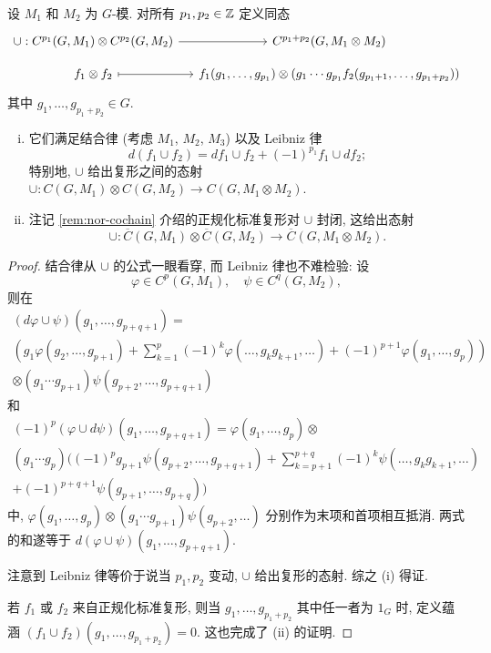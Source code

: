 \begin{definition-proposition}[标准复形上的杯积]\label{def:group-cup-3}
	设 $M_1$ 和 $M_2$ 为 $G$-模. 对所有 $p_1, p_2 \in \mathbb{Z}$ 定义同态
	\[\begin{tikzcd}[row sep=small, column sep=small]
		\cup: C^{p_1}(G, M_1) \otimes C^{p_2}(G, M_2) \arrow[r] & C^{p_1 + p_2}(G, M_1 \otimes M_2) \\
		f_1 \otimes f_2 \arrow[mapsto, r] & f_1(g_1, \ldots, g_{p_1}) \otimes (g_1 \cdots g_{p_1} f_2(g_{p_1 + 1}, \ldots, g_{p_1 + p_2}))
	\end{tikzcd}\]
	其中 $g_1, \ldots, g_{p_1 + p_2} \in G$.
	\begin{enumerate}[(i)]
		\item 它们满足结合律 (考虑 $M_1$, $M_2$, $M_3$) 以及 Leibniz 律
		\[ d(f_1 \cup f_2) = df_1 \cup f_2 + (-1)^{p_1} f_1 \cup d f_2; \]
		特别地, $\cup$ 给出复形之间的态射 $\cup: C(G, M_1) \otimes C(G, M_2) \to C(G, M_1 \otimes M_2)$.
		\item 注记 \ref{rem:nor-cochain} 介绍的正规化标准复形对 $\cup$ 封闭, 这给出态射
		\[ \cup: \overline{C}(G, M_1) \otimes \overline{C}(G, M_2) \to \overline{C}(G, M_1 \otimes M_2). \]
	\end{enumerate}
\end{definition-proposition}
\begin{proof}
	结合律从 $\cup$ 的公式一眼看穿, 而 Leibniz 律也不难检验: 设
	\[ \varphi \in C^p(G, M_1), \quad \psi \in C^q(G, M_2), \]
	则在
	\begin{multline*}
		(d\varphi \cup \psi)(g_1, \ldots, g_{p+q+1}) = \\
		\left( g_1 \varphi(g_2, \ldots, g_{p+1}) + \sum_{k=1}^p (-1)^k \varphi(\ldots, g_k g_{k+1}, \ldots) + (-1)^{p+1} \varphi(g_1, \ldots, g_p) \right) \\
		\otimes (g_1 \cdots g_{p+1}) \psi(g_{p+2}, \ldots, g_{p+q+1})
	\end{multline*}
	和
	\begin{multline*}
		(-1)^p (\varphi \cup d\psi)(g_1, \ldots, g_{p+q+1}) = \varphi(g_1, \ldots, g_p) \otimes \\
		(g_1 \cdots g_p) \bigg( (-1)^p g_{p+1} \psi(g_{p+2}, \ldots, g_{p+q+1}) + \sum_{k=p+1}^{p+q} (-1)^k \psi(\ldots, g_k g_{k+1}, \ldots) \\
		+ (-1)^{p+q+1} \psi(g_{p+1}, \ldots, g_{p+q}) \bigg)
	\end{multline*}
	中, $\varphi(g_1, \ldots, g_p) \otimes (g_1 \cdots g_{p+1}) \psi(g_{p+2}, \ldots)$ 分别作为末项和首项相互抵消. 两式的和遂等于 $d(\varphi \cup \psi)(g_1, \ldots, g_{p+q+1})$.
	
	注意到 Leibniz 律等价于说当 $p_1, p_2$ 变动, $\cup$ 给出复形的态射. 综之 (i) 得证.
	
	若 $f_1$ 或 $f_2$ 来自正规化标准复形, 则当 $g_1, \ldots, g_{p_1 + p_2}$ 其中任一者为 $1_G$ 时, 定义蕴涵 $(f_1 \cup f_2)(g_1, \ldots, g_{p_1 + p_2}) = 0$. 这也完成了 (ii) 的证明.
\end{proof}

